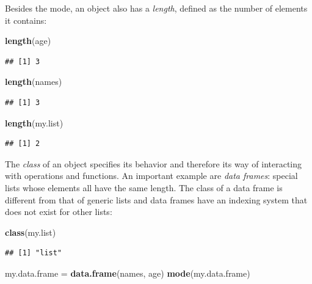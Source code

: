 \documentclass[]{book}
\newenvironment{Shaded}{\begin{snugshade}}{\end{snugshade}}
\newcommand{\KeywordTok}[1]{\textcolor[rgb]{0.13,0.29,0.53}{\textbf{#1}}}
\newcommand{\NormalTok}[1]{#1}
\newcommand{\StringTok}[1]{\textcolor[rgb]{0.31,0.60,0.02}{#1}}
\begin{document}
Besides the mode, an object also has a \emph{length}, defined as the number of elements it contains:

\begin{Shaded}
\begin{Highlighting}[]
\KeywordTok{length}\NormalTok{(age)}
\end{Highlighting}
\end{Shaded}

\begin{verbatim}
## [1] 3
\end{verbatim}

\begin{Shaded}
\begin{Highlighting}[]
\KeywordTok{length}\NormalTok{(names)}
\end{Highlighting}
\end{Shaded}

\begin{verbatim}
## [1] 3
\end{verbatim}

\begin{Shaded}
\begin{Highlighting}[]
\KeywordTok{length}\NormalTok{(my.list)}
\end{Highlighting}
\end{Shaded}

\begin{verbatim}
## [1] 2
\end{verbatim}

The \emph{class} of an object specifies its behavior and therefore its way of interacting with operations and functions. An important example are \emph{data frames}: special lists whose elements all have the same length. The class of a data frame is different from that of generic lists and data frames have an indexing system that does not exist for other lists:

\begin{Shaded}
\begin{Highlighting}[]
\KeywordTok{class}\NormalTok{(my.list)}
\end{Highlighting}
\end{Shaded}

\begin{verbatim}
## [1] "list"
\end{verbatim}

\begin{Shaded}
\begin{Highlighting}[]
\NormalTok{my.data.frame =}\StringTok{ }\KeywordTok{data.frame}\NormalTok{(names, age)}
\KeywordTok{mode}\NormalTok{(my.data.frame)}
\end{Highlighting}
\end{Shaded}
\end{document}
